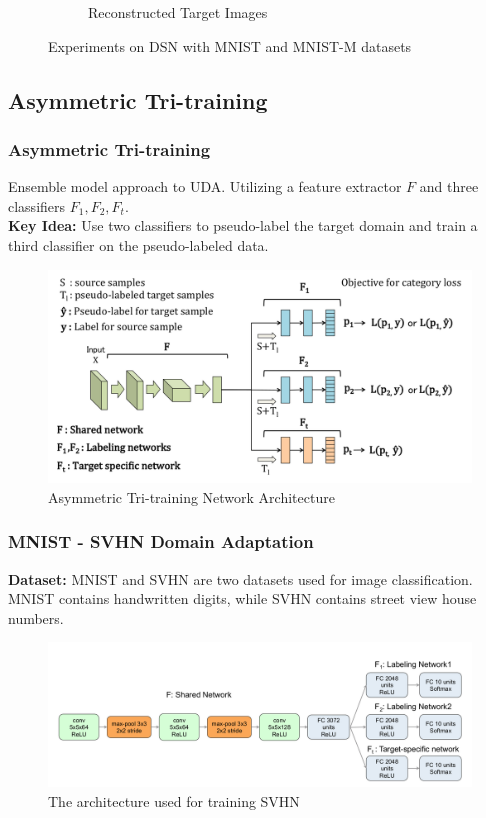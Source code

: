 \documentclass{beamer}
\begin{document}
\begin{frame}
\begin{figure}
\begin{subfigure}[b]{0.4\linewidth}
            \caption{\small Reconstructed Target Images}
        \end{subfigure}
        \caption{\small Experiments on DSN with MNIST and MNIST-M datasets}
    \end{figure}

    

\end{frame}


\subsection{Asymmetric Tri-training}
\begin{frame}
    \frametitle{Asymmetric Tri-training}

    Ensemble model approach to UDA. Utilizing a feature extractor \(F\) and three classifiers \(F_1,F_2,F_t\).\\
    \textbf{Key Idea:} Use two classifiers to pseudo-label the target domain and train a third classifier on the pseudo-labeled data.\\


    \begin{figure}[h]
        \centering
        \includegraphics[width=0.9\linewidth]{ATT_achi.png}
        \caption{Asymmetric Tri-training Network Architecture}
    \end{figure}
\end{frame}

\begin{frame}
    \frametitle{MNIST - SVHN Domain Adaptation}
    \textbf{Dataset:} MNIST and SVHN are two datasets used for image classification. MNIST contains handwritten digits, while SVHN contains street view house numbers.\\

    \begin{figure}[h]
        \centering
        \includegraphics[width=0.9\linewidth]{att-msvhn-a.png}
        \caption{The architecture used for training SVHN}
    \end{figure}

\end{frame}
\end{document}
